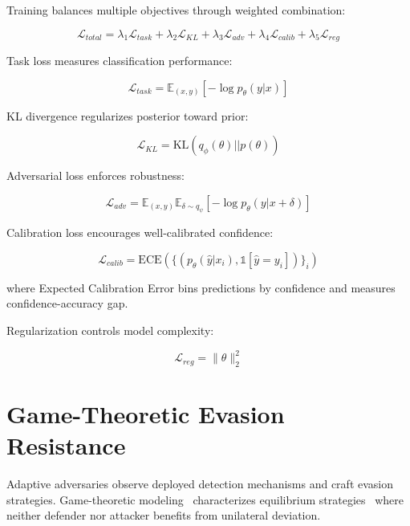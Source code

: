Training balances multiple objectives through weighted combination:

\begin{equation}
\mathcal{L}_{total} = \lambda_1 \mathcal{L}_{task} + \lambda_2 \mathcal{L}_{KL} + \lambda_3 \mathcal{L}_{adv} + \lambda_4 \mathcal{L}_{calib} + \lambda_5 \mathcal{L}_{reg}
\end{equation}

Task loss measures classification performance:

\begin{equation}
\mathcal{L}_{task} = \mathbb{E}_{(x,y)}[-\log p_\theta(y|x)]
\end{equation}

KL divergence regularizes posterior toward prior:

\begin{equation}
\mathcal{L}_{KL} = \text{KL}(q_\phi(\theta) || p(\theta))
\end{equation}

Adversarial loss enforces robustness:

\begin{equation}
\mathcal{L}_{adv} = \mathbb{E}_{(x,y)} \mathbb{E}_{\delta \sim q_\psi}[-\log p_\theta(y|x+\delta)]
\end{equation}

Calibration loss encourages well-calibrated confidence:

\begin{equation}
\mathcal{L}_{calib} = \text{ECE}(\{(p_\theta(\hat{y}|x_i), \mathbb{1}[\hat{y} = y_i])\}_i)
\end{equation}

where Expected Calibration Error bins predictions by confidence and measures confidence-accuracy gap.

Regularization controls model complexity:

\begin{equation}
\mathcal{L}_{reg} = \|\theta\|_2^2
\end{equation}

\section{Game-Theoretic Evasion Resistance}
\label{sec:models_game_theory}

Adaptive adversaries observe deployed detection mechanisms and craft evasion strategies. Game-theoretic modeling~\cite{bruckner2011stackelberg,liu2017decision} characterizes equilibrium strategies~\cite{nash1950equilibrium} where neither defender nor attacker benefits from unilateral deviation.

